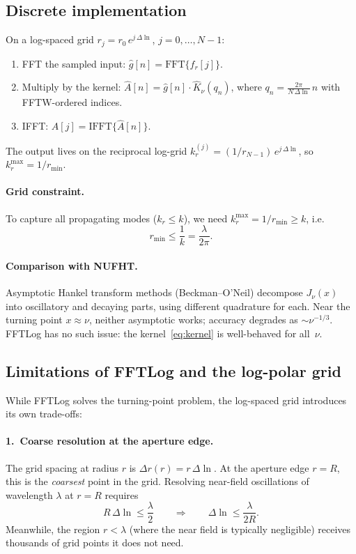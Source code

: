 \documentclass[11pt,a4paper]{article}
\begin{document}
\subsection{Discrete implementation}

On a log-spaced grid $r_j = r_0\,e^{j\,\Delta\!\ln}$, $j=0,\ldots,N-1$:
\begin{enumerate}[nosep]
  \item FFT the sampled input: $\hat g[n] = \mathrm{FFT}\{f_r[j]\}$.
  \item Multiply by the kernel: $\hat A[n] = \hat g[n]\cdot\hat K_\nu(q_n)$,
        where $q_n = \frac{2\pi}{N\,\Delta\!\ln}\,n$ with FFTW-ordered indices.
  \item IFFT: $A[j] = \mathrm{IFFT}\{\hat A[n]\}$.
\end{enumerate}
The output lives on the reciprocal log-grid $k_r^{(j)} = (1/r_{N-1})\,e^{j\,\Delta\!\ln}$,
so $k_r^{\max} = 1/r_{\min}$.

\paragraph{Grid constraint.}
To capture all propagating modes ($k_r \le k$), we need
$k_r^{\max} = 1/r_{\min} \ge k$, i.e.\
\begin{equation}
  \boxed{r_{\min} \le \frac{1}{k} = \frac{\lambda}{2\pi}.}
\end{equation}

\paragraph{Comparison with NUFHT.}
Asymptotic Hankel transform methods (Beckman--O'Neil) decompose $J_\nu(x)$ into
oscillatory and decaying parts, using different quadrature for each.  Near the
turning point $x \approx \nu$, neither asymptotic works; accuracy degrades as
$\sim\nu^{-1/3}$.  FFTLog has no such issue: the kernel~\eqref{eq:kernel} is
well-behaved for all~$\nu$.

\subsection{Limitations of FFTLog and the log-polar grid}
\label{sec:fftlog_limitations}

While FFTLog solves the turning-point problem, the log-spaced grid introduces its
own trade-offs:

\paragraph{1.\ Coarse resolution at the aperture edge.}
The grid spacing at radius $r$ is $\Delta r(r) = r\,\Delta\!\ln$.  At the aperture
edge $r = R$, this is the \emph{coarsest} point in the grid.  Resolving near-field
oscillations of wavelength $\lambda$ at $r = R$ requires
\begin{equation}\label{eq:dln_constraint}
  R\,\Delta\!\ln \le \frac{\lambda}{2}
  \qquad\Longrightarrow\qquad
  \Delta\!\ln \le \frac{\lambda}{2R}.
\end{equation}
Meanwhile, the region $r < \lambda$ (where the near field is typically negligible)
receives thousands of grid points it does not need.
\end{document}
